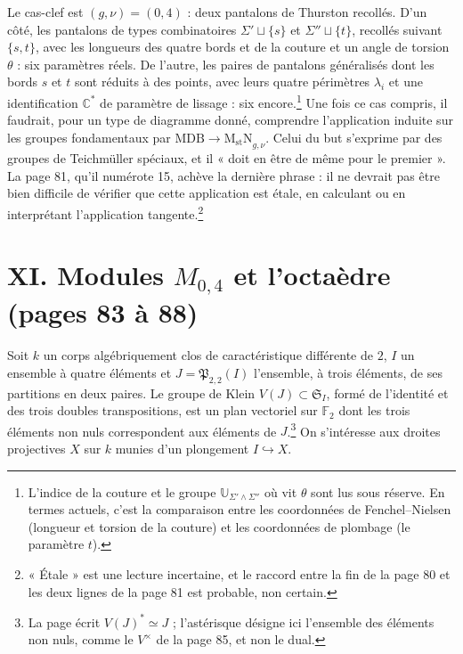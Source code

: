 \documentclass[11pt,a4paper]{article}
\begin{document}
Le cas-clef est $(g,\nu) = (0,4)$ : deux pantalons de Thurston recollés.
D'un côté, les pantalons de types combinatoires $\Sigma' \sqcup \{s\}$ et
$\Sigma'' \sqcup \{t\}$, recollés suivant $\{s,t\}$, avec les longueurs des
quatre bords et de la couture et un angle de torsion $\theta$ : six
paramètres réels. De l'autre, les paires de pantalons généralisés dont les
bords $s$ et $t$ sont réduits à des points, avec leurs quatre périmètres
$\lambda_i$ et une identification $\mathbb{C}^{*}$ de paramètre de lissage :
six encore.\footnote{L'indice de la couture et le groupe
$\mathbb{U}_{\Sigma' \wedge \Sigma''}$ où vit $\theta$ sont lus sous
réserve. En termes actuels, c'est la comparaison entre les coordonnées de
Fenchel--Nielsen (longueur et torsion de la couture) et les coordonnées de
plombage (le paramètre $t$).} Une fois ce cas compris, il faudrait, pour un
type de diagramme donné, comprendre l'application induite sur les groupes
fondamentaux par $\mathrm{MDB} \to \mathrm{M_{st}N}_{g,\nu}$. Celui du but
s'exprime par des groupes de Teichmüller spéciaux, et il « doit en être de
même pour le premier ». La page 81, qu'il numérote 15, achève la dernière
phrase : il ne devrait pas être bien difficile de vérifier que cette
application est étale, en calculant ou en interprétant l'application
tangente.\footnote{« Étale » est une lecture incertaine, et le raccord entre
la fin de la page 80 et les deux lignes de la page 81 est probable, non
certain.}

\section*{XI. Modules $M_{0,4}$ et l'octaèdre (pages 83 à 88)}

Soit $k$ un corps algébriquement clos de caractéristique différente de $2$,
$I$ un ensemble à quatre éléments et $J = \mathfrak{P}_{2,2}(I)$ l'ensemble,
à trois éléments, de ses partitions en deux paires. Le groupe de Klein
$V(J) \subset \mathfrak{S}_I$, formé de l'identité et des trois doubles
transpositions, est un plan vectoriel sur $\mathbb{F}_2$ dont les trois
éléments non nuls correspondent aux éléments de $J$.\footnote{La page écrit
$V(J)^{*} \simeq J$ ; l'astérisque désigne ici l'ensemble des éléments non
nuls, comme le $V^{\times}$ de la page 85, et non le dual.} On s'intéresse
aux droites projectives $X$ sur $k$ munies d'un plongement
$I \hookrightarrow X$.
\end{document}
